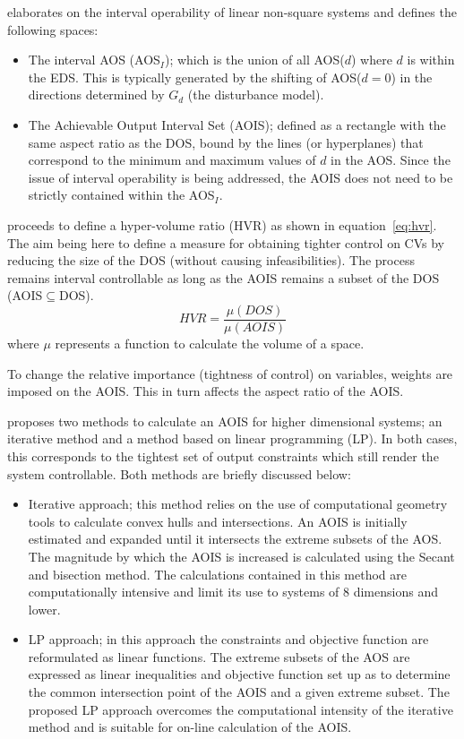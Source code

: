 \citet{limaphd} elaborates on the interval operability of linear non-square systems and defines the following spaces:
\begin{itemize}
  \item The interval AOS (AOS$_I$); which is the union of all AOS($d$) where $d$ is within the EDS. 
This is typically generated by the shifting of AOS($d=0$) in the directions determined by $G_d$ (the disturbance model).%
%
  \item The Achievable Output Interval Set (AOIS); defined as a rectangle with the same aspect ratio as the DOS, bound by the lines (or hyperplanes) that correspond to the minimum and maximum values of $d$ in the AOS. 
Since the issue of interval operability is being addressed, the AOIS does not need to be strictly contained within the AOS$_I$.%
%
\end{itemize}
\citet{limaphd} proceeds to define a hyper-volume ratio (HVR) as shown in equation~\ref{eq:hvr}. 
The aim being here to define a measure for obtaining tighter control on CVs by reducing the size of the DOS (without causing infeasibilities). 
The process remains interval controllable as long as the AOIS remains a subset of the DOS (AOIS$\subseteq$DOS).
\begin{equation}
  \label{eq:hvr}
    HVR = \frac{\mu(DOS)}{\mu(AOIS)}
\end{equation}
where $\mu$ represents a function to calculate the volume of a space.%
%
%
%

To change the relative importance (tightness of control) on variables, weights are imposed on the AOIS. 
This in turn affects the aspect ratio of the AOIS.

\citet{limaphd} proposes two methods to calculate an AOIS for higher dimensional systems; an iterative method and a method based on linear programming (LP). 
In both cases, this corresponds to the tightest set of output constraints which still render the system controllable. 
Both methods are briefly discussed below:
\begin{itemize}
  \item Iterative approach; this method relies on the use of computational geometry tools to calculate convex hulls and intersections. 
An AOIS is initially estimated and expanded until it intersects the extreme subsets of the AOS. 
The magnitude by which the AOIS is increased is calculated using the Secant and bisection method. 
The calculations contained in this method are computationally intensive and limit its use to systems of 8 dimensions and lower.
  \item LP approach; in this approach the constraints and objective function are reformulated as linear functions. 
The extreme subsets of the AOS are expressed as linear inequalities and objective function set up as to determine the common intersection point of the AOIS and a given extreme subset. 
The proposed LP approach overcomes the computational intensity of the iterative method and is suitable for on-line calculation of the AOIS.
\end{itemize}

